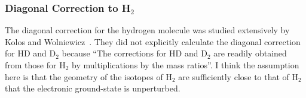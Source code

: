 \subsubsection{Diagonal Correction to H$_2$}
The diagonal correction for the hydrogen molecule was studied extensively by Kolos and Wolniewicz~\cite{Koos1964,Kolos1968,Wolniewicz1983}. They did not explicitly calculate the diagonal correction for HD and D$_2$ because ``The corrections for HD and D$_2$ are readily obtained from those for H$_2$ by multiplications by the mass ratios''. I think the assumption here is that the geometry of the isotopes of H$_2$ are sufficiently close to that of H$_2$ that the electronic ground-state is unperturbed.